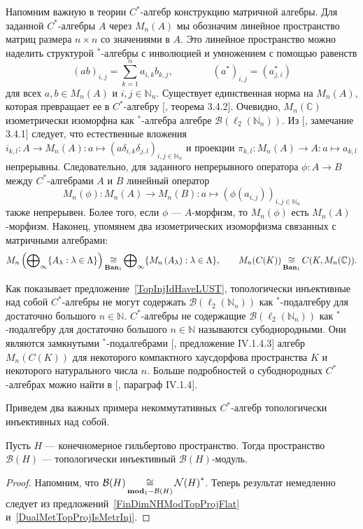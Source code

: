 Напомним важную в теории $C^*$-алгебр конструкцию матричной алгебры. Для
 заданной $C^*$-алгебры $A$ через $M_n(A)$ мы обозначим линейное пространство
 матриц размера $n\times n$ со значениями в $A$. Это линейное пространство можно
 наделить структурой ${}^*$-алгебры с инволюцией и умножением с помощью равенств
$$
{(ab)}_{i,j}=\sum_{k=1}^n a_{i,k}b_{k,j},
\qquad\qquad
{(a^*)}_{i,j}=(a_{j,i}^*)
$$ 
для всех $a,b\in M_n(A)$ и $i,j\in\mathbb{N}_n$. Существует единственная норма
на $M_n(A)$, которая превращает ее в $C^*$-алгебру
[\cite{MurphyCStarAlgsAndOpTh}, теорема 3.4.2]. Очевидно, $M_n(\mathbb{C})$
изометрически изоморфна как ${}^*$-алгебра алгебре
$\mathcal{B}(\ell_2(\mathbb{N}_n))$. Из [\cite{MurphyCStarAlgsAndOpTh},
замечание 3.4.1] следует, что естественные вложения $i_{k,l}:A\to
M_n(A):a\mapsto{(a\delta_{i,k}\delta_{j,l})}_{i,j\in\mathbb{N}_n}$ и проекции
$\pi_{k,l}:M_n(A)\to A:a\mapsto a_{k,l}$ непрерывны. Следовательно, для
заданного непрерывного оператора $\phi:A\to B$ между $C^*$-алгебрами $A$ и $B$
линейный оператор 
$$
M_n(\phi):M_n(A)\to M_n(B):a\mapsto {(\phi(a_{i,j}))}_{i,j\in\mathbb{N}_n}
$$ 
также непрерывен. Более того, если $\phi$ --- $A$-морфизм, то $M_n(\phi)$ есть
$M_n(A)$-морфизм. Наконец, упомянем два изометрических изоморфизма связанных с
матричными алгебрами:
$$
M_n\left(\bigoplus\nolimits_\infty \{A_\lambda:\lambda\in\Lambda \}\right)
\mathop{\mathbin{\cong}}\limits_{\mathbf{Ban}_1}
\bigoplus\nolimits_\infty \{M_n\left(A_\lambda\right):\lambda\in\Lambda \},
\qquad
M_n(C(K))\mathop{\mathbin{\cong}}\limits_{\mathbf{Ban}_1}C(K,M_n(\mathbb{C})).
$$

Как показывает предложение~\ref{TopInjIdHaveLUST}, топологически инъективные над
собой $C^*$-алгебры не могут содержать $\mathcal{B}(\ell_2(\mathbb{N}_n))$ как
${}^*$-подалгебру для достаточно большого $n\in\mathbb{N}$. $C^*$-алгебры не
содержащие $\mathcal{B}(\ell_2(\mathbb{N}_n))$ как ${}^*$-подалгебру для
достаточно большого $n\in\mathbb{N}$ называются субоднородными. Они являются
замкнутыми ${}^*$-подалгебрами [\cite{BlackadarOpAlg}, предложение IV.1.4.3]
алгебр $M_n(C(K))$ для некоторого компактного хаусдорфова пространства $K$ и
некоторого натурального числа $n$. Больше подробностей о субоднородных
$C^*$-алгебрах можно найти в [\cite{BlackadarOpAlg}, параграф IV.1.4]. 

Приведем два важных примера некоммутативных $C^*$-алгебр топологически
инъективных над собой.

\begin{proposition}\label{FinDimBHModTopInj} Пусть $H$ --- конечномерное
гильбертово пространство. Тогда пространство $\mathcal{B}(H)$ --- топологически
инъективный $\mathcal{B}(H)$-модуль. 
\end{proposition}
\begin{proof} Напомним, что
$\mathcal{B}(H)\mathop{\mathbin{\cong}}\limits_{\mathbf{mod}_1-\mathcal{B}(H)}{\mathcal{N}(H)}^*$. Теперь
результат немедленно следует из предложений~\ref{FinDimNHModTopProjFlat}
и~\ref{DualMetTopProjIsMetrInj}.
\end{proof}

